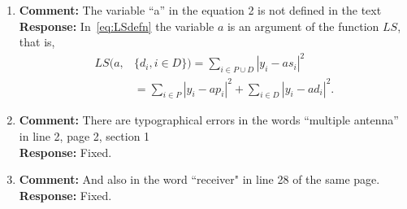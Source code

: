 \documentclass{article}
\newcommand{\abs}[1]{{\left\vert #1 \right\vert}}
\begin{document}
\begin{enumerate}

\item \textbf{Comment:}  The variable  ``a'' in the equation 2 is not defined in the text \\
\textbf{Response:} In~\eqref{eq:LSdefn} the variable $a$ is an argument of the function $LS$, that is,
\[
\begin{split}
LS(a, &\{d_i, i \in D\}) = \sum_{i \in P \cup D} \abs{ y_i - a s_i }^2  \\
&= \sum_{i \in P} \abs{ y_i - a p_i }^2 + \sum_{i \in D} \abs{ y_i - a d_i }^2.
\end{split}
\]

\item \textbf{Comment:}  There are typographical errors in the words  ``multiple antenna'' in line 2, page 2, section 1 \\
\textbf{Response:} Fixed.

\item \textbf{Comment:}  And also in the word ``receiver" in line 28 of the same page.
 \\
\textbf{Response:} Fixed.


\end{enumerate}

{
\small

}
\end{document}
